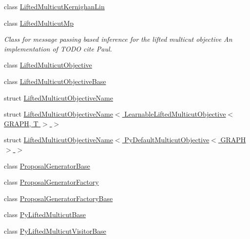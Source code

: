 \begin{DoxyCompactItemize}
class \hyperlink{classnifty_1_1graph_1_1optimization_1_1lifted__multicut_1_1LiftedMulticutKernighanLin}{Lifted\+Multicut\+Kernighan\+Lin}
\item 
class \hyperlink{classnifty_1_1graph_1_1optimization_1_1lifted__multicut_1_1LiftedMulticutMp}{Lifted\+Multicut\+Mp}
\begin{DoxyCompactList}\small\item\em Class for message passing based inference for the lifted multicut objective An implementation of T\+O\+D\+O cite Paul. \end{DoxyCompactList}\item 
class \hyperlink{classnifty_1_1graph_1_1optimization_1_1lifted__multicut_1_1LiftedMulticutObjective}{Lifted\+Multicut\+Objective}
\item 
class \hyperlink{classnifty_1_1graph_1_1optimization_1_1lifted__multicut_1_1LiftedMulticutObjectiveBase}{Lifted\+Multicut\+Objective\+Base}
\item 
struct \hyperlink{structnifty_1_1graph_1_1optimization_1_1lifted__multicut_1_1LiftedMulticutObjectiveName}{Lifted\+Multicut\+Objective\+Name}
\item 
struct \hyperlink{structnifty_1_1graph_1_1optimization_1_1lifted__multicut_1_1LiftedMulticutObjectiveName_3_01Leara8d2df610bda1b7105525110a645f4ce}{Lifted\+Multicut\+Objective\+Name$<$ Learnable\+Lifted\+Multicut\+Objective$<$ G\+R\+A\+P\+H, T $>$ $>$}
\item 
struct \hyperlink{structnifty_1_1graph_1_1optimization_1_1lifted__multicut_1_1LiftedMulticutObjectiveName_3_01PyDe355903af316bd27192e064a422e0c831}{Lifted\+Multicut\+Objective\+Name$<$ Py\+Default\+Multicut\+Objective$<$ G\+R\+A\+P\+H $>$ $>$}
\item 
class \hyperlink{classnifty_1_1graph_1_1optimization_1_1lifted__multicut_1_1ProposalGeneratorBase}{Proposal\+Generator\+Base}
\item 
class \hyperlink{classnifty_1_1graph_1_1optimization_1_1lifted__multicut_1_1ProposalGeneratorFactory}{Proposal\+Generator\+Factory}
\item 
class \hyperlink{classnifty_1_1graph_1_1optimization_1_1lifted__multicut_1_1ProposalGeneratorFactoryBase}{Proposal\+Generator\+Factory\+Base}
\item 
class \hyperlink{classnifty_1_1graph_1_1optimization_1_1lifted__multicut_1_1PyLiftedMulticutBase}{Py\+Lifted\+Multicut\+Base}
\item 
class \hyperlink{classnifty_1_1graph_1_1optimization_1_1lifted__multicut_1_1PyLiftedMulticutVisitorBase}{Py\+Lifted\+Multicut\+Visitor\+Base}

\end{DoxyCompactItemize}
